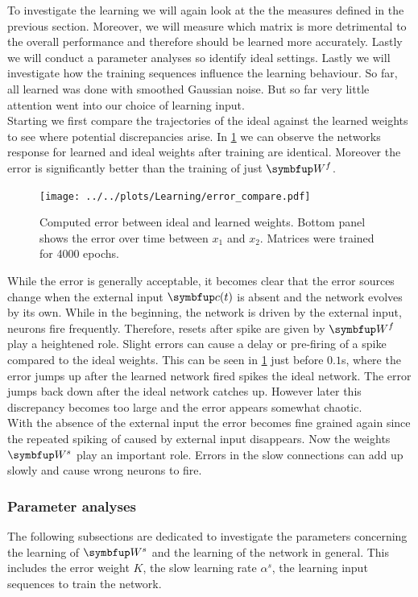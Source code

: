 To investigate the learning we will again look at the the measures defined in the previous section. Moreover, we will measure which matrix is more detrimental to the overall performance and therefore should be learned more accurately. Lastly we will conduct a parameter analyses so identify ideal settings. Lastly we will investigate how the training sequences influence the learning behaviour. So far, all learned was done with smoothed Gaussian noise. But so far very little attention went into our choice of learning input.\\
Starting we first compare the trajectories of the ideal against the learned weights to see where potential discrepancies arise. In \cref{fig:Ws_ideal_learned_compare} we can observe the networks response for learned and ideal weights after training are identical. Moreover the error is significantly better than the training of just $\bmu{W}^f$.
\begin{figure}
	\centering
	\texttt{[image: ../../plots/Learning/error\_compare.pdf]}
	\caption{Computed error between ideal and learned weights. Bottom panel shows the error over time between $x_1$ and $x_2$. Matrices were trained for 4000 epochs.}
	\label{fig:Ws_ideal_learned_compare}
\end{figure}
While the error is generally acceptable, it becomes clear that the error sources change when the external input $\bmu{c}(t)$ is absent and the network evolves by its own. While in the beginning, the network is driven by the external input, neurons fire frequently. Therefore, resets after spike are given by $\bmu{W}^f$ play a heightened role. Slight errors can cause a delay or pre-firing of a spike compared to the ideal weights. This can be seen in \cref{fig:Ws_ideal_learned_compare} just before $0.1$s, where the error jumps up after the learned network fired spikes the ideal network. The error jumps back down after the ideal network catches up. However later this discrepancy becomes too large and the error appears somewhat chaotic.\\
With the absence of the external input the error becomes fine grained again since the repeated spiking of caused by external input disappears. Now the weights $\bmu{W}^s$ play an important role. Errors in the slow connections can add up slowly and cause wrong neurons to fire.\\

\subsubsection{Parameter analyses}
The following subsections are dedicated to investigate the parameters concerning the learning of $\bmu{W}^s$ and the learning of the network in general. This includes the error weight $K$, the slow learning rate $\alpha^s$, the learning input sequences to train the network.
